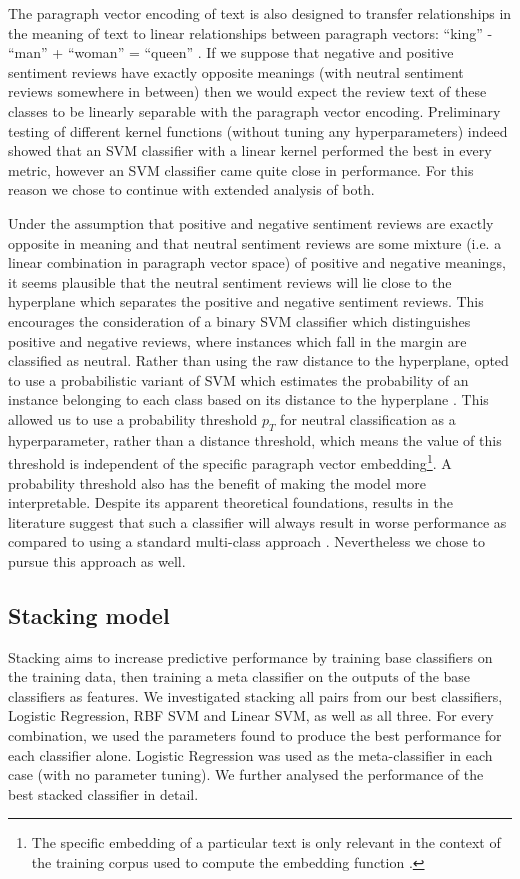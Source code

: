 \documentclass[11pt]{article}
\newcommand{\drafting}[1]{\textcolor{OliveGreen}{#1}}
\begin{document}
The paragraph vector encoding of text is also designed to transfer relationships in the meaning of text to linear relationships between paragraph vectors: ``king'' - ``man'' + ``woman'' = ``queen'' \cite{le_distributed_2014}. If we suppose that negative and positive sentiment reviews have exactly opposite meanings (with neutral sentiment reviews somewhere in between) then we would expect the review text of these classes to be linearly separable with the paragraph vector encoding. Preliminary testing of different kernel functions (without tuning any hyperparameters) indeed showed that an SVM classifier with a linear kernel performed the best in every metric, however an SVM classifier came quite close in performance. For this reason we chose to continue with extended analysis of both.

Under the assumption that positive and negative sentiment reviews are exactly opposite in meaning and that neutral sentiment reviews are some mixture (i.e. a linear combination in paragraph vector space) of positive and negative meanings, it seems plausible that the neutral sentiment reviews will lie close to the hyperplane which separates the positive and negative sentiment reviews. This encourages the consideration of a binary SVM classifier which distinguishes positive and negative reviews, where instances which fall in the margin are classified as neutral. Rather than using the raw distance to the hyperplane, opted to use a probabilistic variant of SVM which estimates the probability of an instance belonging to each class based on its distance to the hyperplane \cite{platt_probabilistic_1999}. This allowed us to use a probability threshold $p_T$ for neutral classification as a hyperparameter, rather than a distance threshold, which means the value of this threshold is independent of the specific paragraph vector embedding\footnote{The specific embedding of a particular text is only relevant in the context of the training corpus used to compute the embedding function \cite{le_distributed_2014}.}. A probability threshold also has the benefit of making the model more interpretable. Despite its apparent theoretical foundations, results in the literature suggest that such a classifier will always result in worse performance as compared to using a standard multi-class approach \cite{koppel_importance_2006}. Nevertheless we chose to pursue this approach as well.


\subsection{Stacking model}
\drafting{
Stacking aims to increase predictive performance by training base classifiers on the training data, then training a meta classifier on the outputs of the base classifiers as features. We investigated stacking all pairs from our best classifiers, Logistic Regression, RBF SVM and Linear SVM, as well as all three. For every combination, we used the parameters found to produce the best performance for each classifier alone. Logistic Regression was used as the meta-classifier in each case (with no parameter tuning).
We further analysed the performance of the best stacked classifier in detail.
}
\end{document}
